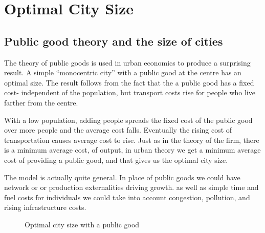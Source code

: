 \chapter{Optimal City Size}

\section{Public good theory and the size of cities}

The theory of public goods is used in urban economics  to produce a surprising result. A simple ``monocentric city'' with a public good at the centre has an optimal size. The result follows from the fact that the a public good has a fixed cost- independent of the population, but transport costs rise for people who live farther from the centre.


With a low population, adding people spreads the fixed cost of the public good over more people and the average cost falls. Eventually the rising cost of transportation causes average cost to rise. Just as in the theory of the firm, there is a minimum average cost, of output, in urban theory we get a minimum average cost of providing a public good, and that gives us the optimal city size. 


The model is actually quite general. In place of public goods we could  have network or or production externalities driving growth. as well as  simple time and fuel costs for individuals we could take into account congestion, pollution, and rising infrastructure costs.



\begin{figure}
\caption{Optimal city size with a public good}
\end{figure}



